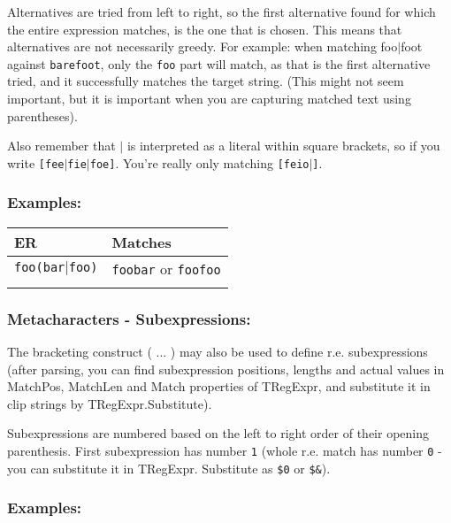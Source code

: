 Alternatives are tried from left to right, so the first alternative found
for which the entire expression matches, is the one that is chosen. This
means that alternatives are not necessarily greedy. For example: when
matching foo$|$foot against \texttt{barefoot}, only the \texttt{foo} part
will match, as that is the first alternative tried, and it successfully
matches the target string. (This might not seem important, but it is
important when you are capturing matched text using parentheses).

Also remember that \texttt{$|$} is interpreted as a literal within square
brackets, so if you write \texttt{[fee$|$fie$|$foe]}. You're really only
matching \texttt{[feio$|$]}.


\subsubsection{Examples:}

\begin{footnotesize}
  \begin{tabularx}{\textwidth}{>{\hsize=0.3\hsize}X>{\hsize=0.7\hsize}X}\\
    \hline
    \textbf{ER} & \textbf{Matches} \\
    \hline
    \texttt{foo(bar$|$foo)} & \texttt{foobar} or \texttt{foofoo} \\
    \hline
    \\
  \end{tabularx}
\end{footnotesize}


\subsubsection{Metacharacters - Subexpressions:}

The bracketing construct ( ... ) may also be used to define r.e.
subexpressions (after parsing, you can find subexpression positions,
lengths and actual values in MatchPos, MatchLen and Match properties
of TRegExpr, and substitute it in clip strings by TRegExpr.Substitute).

Subexpressions are numbered based on the left to right order of their
opening parenthesis. First subexpression has number \texttt{1} (whole
r.e. match has number \texttt{0} - you can substitute it in TRegExpr.
Substitute as \texttt{\$0} or \texttt{\$\&}).


\subsubsection{Examples:}

